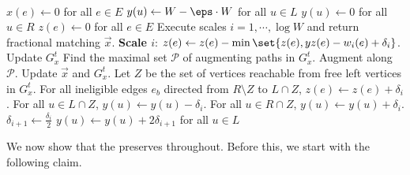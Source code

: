 \begin{algorithm}[H] 
	\\
	\caption{\textsc{Weighted-Frac-Matching}($G,\kappa,\eps$)}
	\begin{algorithmic}[1]
		\State $x(e)\leftarrow 0$ for all $e\in E$ 
		\State $y(u)\leftarrow W-\eps\cdot W$ for all $u\in L$ 
		\State $y(u)\leftarrow 0$ for all $u\in R$ 
		\State $z(e)\leftarrow 0$ for all $e\in E$ 
	\EndProcedure
	\State Execute scales $i=1,\cdots, \log W$ and return fractional matching $\vec{x}$.
	\State \textbf{Scale $i$}:
		\State $z(e)\leftarrow z(e)-\min\set{z(e), yz(e)-w_i(e)+\delta_i}$.  \label{item:zadj} 
		\EndFor
		\State Update $G^t_x$
		\State Find the maximal set $\mathcal{P}$ of augmenting paths in $G^t_x$. \label{item:augpath}
		\State Augment along $\mathcal{P}$.  \label{item:augmentation}
		\State Update $\vec{x}$ and $G^t_x$.  \label{item:augmentation2}
		\EndProcedure
		\State Let $Z$ be the set of vertices reachable from free left vertices in $G^t_x$.
		\State For all ineligible edges $e_b$ directed from $R\setminus Z$ to $L\cap Z$, $z(e)\leftarrow z(e)+\delta_i$.
		\State For all $u\in L\cap Z$, $y(u)\leftarrow y(u)-\delta_i$.
		\State For all $u\in R\cap Z$, $y(u)\leftarrow y(u)+\delta_i$.
	\EndProcedure
		\EndWhile
		\State $\delta_{i+1}\leftarrow \frac{\delta_{i}}{2}$
		\State $y(u)\leftarrow y(u)+2\delta_{i+1}$ for all $u\in L$
	\EndProcedure
		\end{algorithmic}
	 \label{alg:weightedfracmatching}
\end{algorithm}

We now show that the  preserves  throughout. Before this, we start with the following claim.


